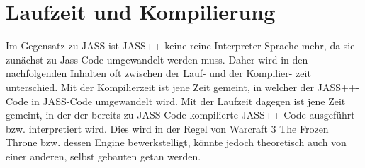\chapter { Laufzeit und Kompilierung }

Im Gegensatz zu JASS ist JASS++ keine reine Interpreter-Sprache mehr, da sie zunächst zu Jass-Code
umgewandelt werden muss. Daher wird in den nachfolgenden Inhalten oft zwischen der Lauf- und der Kompilier-
zeit unterschied. Mit der Kompilierzeit ist jene Zeit gemeint, in welcher der JASS++-Code in JASS-Code
umgewandelt wird. Mit der Laufzeit dagegen ist jene Zeit gemeint, in der der bereits zu JASS-Code kompilierte
JASS++-Code ausgeführt bzw. interpretiert wird. Dies wird in der Regel von Warcraft 3 The Frozen Throne bzw. dessen Engine
bewerkstelligt, könnte jedoch theoretisch auch von einer anderen, selbst gebauten getan werden. 
